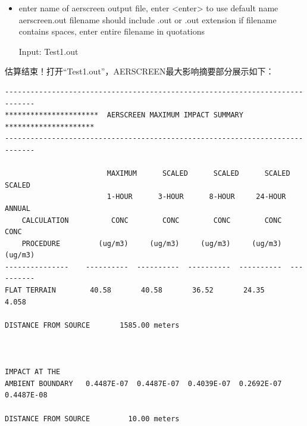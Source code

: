 \begin{framed}
\begin{itemize}[label=\textcolor{orange}{Prompt:}, align=left, leftmargin=*, itemsep=-0.5em]
    \item enter name of aerscreen output file, enter <enter> to use default name aerscreen.out filename should include .out or .out extension if filename contains spaces, enter entire filename in quotations
    \item[Input:] Test1.out
\end{itemize}
\noindent 估算结束！打开“Test1.out”，AERSCREEN最大影响摘要部分展示如下：
\begin{verbatim}
-----------------------------------------------------------------------------
**********************  AERSCREEN MAXIMUM IMPACT SUMMARY  *********************
-----------------------------------------------------------------------------

                        MAXIMUM      SCALED      SCALED      SCALED      SCALED
                        1-HOUR      3-HOUR      8-HOUR     24-HOUR      ANNUAL
    CALCULATION          CONC        CONC        CONC        CONC        CONC
    PROCEDURE         (ug/m3)     (ug/m3)     (ug/m3)     (ug/m3)     (ug/m3)
---------------    ----------  ----------  ----------  ----------  ----------
FLAT TERRAIN        40.58       40.58       36.52       24.35       4.058    

DISTANCE FROM SOURCE       1585.00 meters



IMPACT AT THE
AMBIENT BOUNDARY   0.4487E-07  0.4487E-07  0.4039E-07  0.2692E-07  0.4487E-08

DISTANCE FROM SOURCE         10.00 meters
\end{verbatim}
\end{framed}
\normalsize


